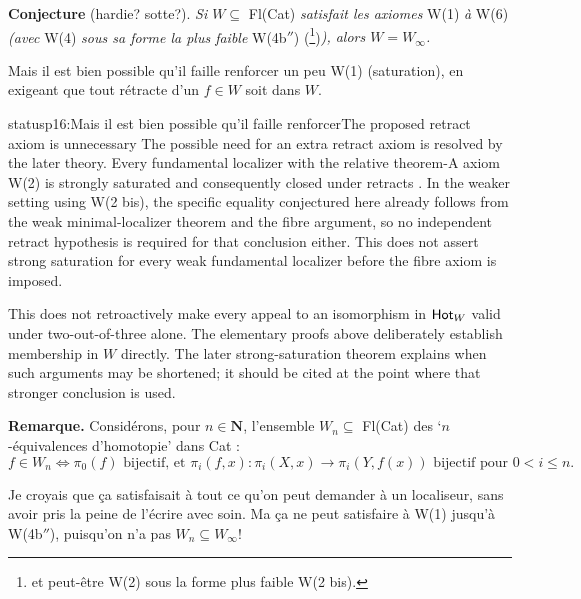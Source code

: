 \textbf{Conjecture} (hardie? sotte?). \textit{Si $W \subseteq$} Fl(Cat) \textit{satisfait les axiomes} W(1) \textit{à} W(6) \textit{(avec} W(4) \textit{sous sa forme la plus faible} W(4b$''$) (\footnote[36]{et peut-être W(2) sous la forme plus faible W(2 bis).})\textit{), alors $W = W_\infty$.}

Mais il est bien possible qu'il faille renforcer un peu W(1) (saturation), en exigeant que tout rétracte d'un $f \in W$ soit dans $W$.

\begin{dcomment}{status}{p16:Mais il est bien possible qu'il faille renforcer}{The proposed retract axiom is unnecessary}
The possible need for an extra retract axiom is resolved by the later theory. Every fundamental localizer with the relative theorem-A axiom W(2) is strongly saturated and consequently closed under retracts \citep[Proposition~4.2.4]{Cisinski2006}. In the weaker setting using W(2 bis), the specific equality conjectured here already follows from the weak minimal-localizer theorem and the fibre argument, so no independent retract hypothesis is required for that conclusion either. This does not assert strong saturation for every weak fundamental localizer before the fibre axiom is imposed.

This does not retroactively make every appeal to an isomorphism in \(\mathsf{Hot}_W\) valid under two-out-of-three alone. The elementary proofs above deliberately establish membership in \(W\) directly. The later strong-saturation theorem explains when such arguments may be shortened; it should be cited at the point where that stronger conclusion is used.
\end{dcomment}


\textbf{Remarque.} Considérons, pour $n \in \mathbf{N}$, l'ensemble $W_n \subseteq$ Fl(Cat) des `$n$-équivalences d'homotopie' dans Cat :
\[ f \in W_n \iff \pi_0(f) \text{ bijectif, et } \pi_i(f, x) : \pi_i(X, x) \longrightarrow \pi_i(Y, f(x)) \text{ bijectif pour } 0 < i \leq n. \]

Je croyais que ça satisfaisait à tout ce qu'on peut demander à un localiseur, sans avoir pris la peine de l'écrire avec soin. Ma ça ne peut satisfaire à W(1) jusqu'à W(4b$''$), puisqu'on %
n'a pas $W_n \subseteq W_\infty$!

